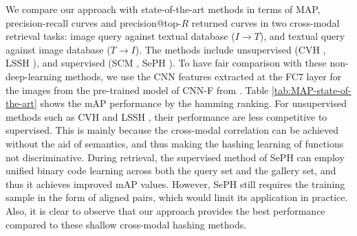 \documentclass[10pt,journal,twocolumn]{IEEEtran}
\begin{document}
We compare our approach with state-of-the-art methods in terms of MAP, precision-recall curves and precision@top-$R$ returned curves in two cross-modal retrieval tasks: image query against textual database ($I \rightarrow T$), and textual query against image database ($T \rightarrow I$). The methods include unsupervised (CVH \cite{CVH}, LSSH \cite{LSSH}), and supervised (SCM \cite{SCM}, SePH \cite{Semantics-hash}). To have fair comparison with these non-deep-learning methods, we use the CNN features extracted at the FC7 layer for the images from the pre-trained model of CNN-F from \cite{M-Net}. Table \ref{tab:MAP-state-of-the-art} shows the mAP performance by the hamming ranking. For unsupervised methods such as CVH \cite{CVH} and LSSH \cite{LSSH}, their performance are less competitive to supervised. This is mainly because the cross-modal correlation can be achieved without the aid of semantics, and thus making the hashing learning of functions not discriminative. During retrieval, the supervised method of SePH \cite{Semantics-hash} can employ unified binary code learning across both the query set and the gallery set, and thus it achieves improved mAP values. However, SePH \cite{Semantics-hash} still requires the training sample in the form of aligned pairs, which would limit its application in practice. Also, it is clear to observe that our approach provides the best performance compared to these shallow cross-modal hashing methods.
\end{document}
